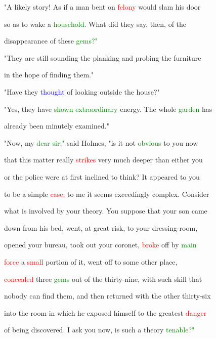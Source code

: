  "A likely story! As if a man bent on \textcolor{red}{felony} would \textcolor{BurntOrange}{slam} his door

 so as to wake a \textcolor{green}{household.} What did they say, then, of the

 disappearance of these \textcolor{green}{gems?"}



 "They are still sounding the planking and probing the furniture

 in the \textcolor{BurntOrange}{hope} of finding them."



 "Have they \textcolor{blue}{thought} of looking outside the house?"



 "Yes, they have \textcolor{green}{shown} \textcolor{green}{extraordinary} energy. The whole \textcolor{green}{garden} has

 already been minutely examined."



 "Now, my \textcolor{green}{dear} \textcolor{green}{sir,"} said Holmes, "is it not \textcolor{green}{obvious} to you now

 that this matter really \textcolor{red}{strikes} very much deeper than either you

 or the \textcolor{BurntOrange}{police} were at first inclined to think? It appeared to you

 to be a simple \textcolor{red}{case;} to me it seems exceedingly complex. Consider

 what is involved by your \textcolor{BurntOrange}{theory.} You suppose that your son came

 down from his bed, went, at great \textcolor{BurntOrange}{risk,} to your dressing-room,

 opened your bureau, took out your coronet, \textcolor{red}{broke} off by \textcolor{green}{main}

 \textcolor{red}{force} a \textcolor{red}{small} portion of it, went off to some other place,

 \textcolor{red}{concealed} three \textcolor{green}{gems} out of the thirty-nine, with such skill that

 nobody can find them, and then returned with the other thirty-six

 into the room in which he \textcolor{BurntOrange}{exposed} himself to the greatest \textcolor{red}{danger}

 of being discovered. I ask you now, is such a \textcolor{BurntOrange}{theory} \textcolor{green}{tenable?"}



